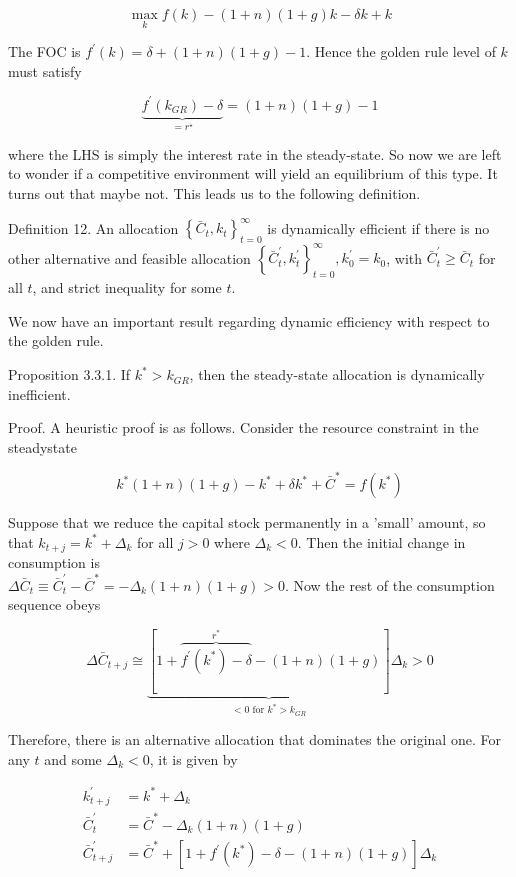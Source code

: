 \documentclass[10pt]{article}
\begin{document}
$$
\max _{k} f(k)-(1+n)(1+g) k-\delta k+k
$$

The FOC is $f^{\prime}(k)=\delta+(1+n)(1+g)-1$. Hence the golden rule level of $k$ must satisfy


\begin{equation*}
\underbrace{f^{\prime}\left(k_{G R}\right)-\delta}_{=r^{\star}}=(1+n)(1+g)-1 \tag{3.5}
\end{equation*}


where the LHS is simply the interest rate in the steady-state. So now we are left to wonder if a competitive environment will yield an equilibrium of this type. It turns out that maybe not. This leads us to the following definition.

Definition 12. An allocation $\left\{\bar{C}_{t}, k_{t}\right\}_{t=0}^{\infty}$ is dynamically efficient if there is no other alternative and feasible allocation $\left\{\bar{C}_{t}^{\prime}, k_{t}^{\prime}\right\}_{t=0}^{\infty}, k_{0}^{\prime}=k_{0}$, with $\bar{C}_{t}^{\prime} \geq \bar{C}_{t}$ for all $t$, and strict inequality for some $t$.

We now have an important result regarding dynamic efficiency with respect to the golden rule.

Proposition 3.3.1. If $k^{*}>k_{G R}$, then the steady-state allocation is dynamically inefficient.

Proof. A heuristic proof is as follows. Consider the resource constraint in the steadystate

$$
k^{*}(1+n)(1+g)-k^{*}+\delta k^{*}+\bar{C}^{*}=f\left(k^{*}\right)
$$

Suppose that we reduce the capital stock permanently in a 'small' amount, so that $k_{t+j}=k^{*}+\Delta_{k}$ for all $j>0$ where $\Delta_{k}<0$. Then the initial change in consumption is\\
$\Delta \bar{C}_{t} \equiv \bar{C}_{t}^{\prime}-\bar{C}^{*}=-\Delta_{k}(1+n)(1+g)>0$. Now the rest of the consumption sequence obeys

$$
\Delta \bar{C}_{t+j} \cong \underbrace{[1+\overbrace{f^{\prime}\left(k^{*}\right)-\delta}^{r^{*}}-(1+n)(1+g)]}_{<0 \text { for } k^{*}>k_{G R}} \Delta_{k}>0
$$

Therefore, there is an alternative allocation that dominates the original one. For any $t$ and some $\Delta_{k}<0$, it is given by

$$
\begin{aligned}
k_{t+j}^{\prime} & =k^{*}+\Delta_{k} \\
\bar{C}_{t}^{\prime} & =\bar{C}^{*}-\Delta_{k}(1+n)(1+g) \\
\bar{C}_{t+j}^{\prime} & =\bar{C}^{*}+\left[1+f^{\prime}\left(k^{*}\right)-\delta-(1+n)(1+g)\right] \Delta_{k}
\end{aligned}
$$
\end{document}
